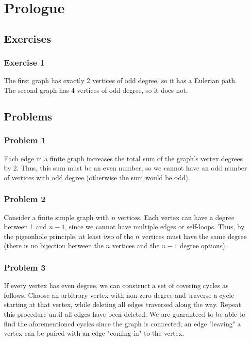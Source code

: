 \section{Prologue}

\subsection{Exercises}

\subsubsection{Exercise 1}
The first graph has exactly 2 vertices of odd degree, so it has a Eulerian path. The second graph has 4 
vertices of odd degree, so it does not. 

\subsection{Problems}

\subsubsection{Problem 1}
Each edge in a finite graph increases the total sum of the graph's vertex degrees by 2. Thus, this sum must
be an even number, so we cannot have an odd number of vertices with odd degree (otherwise the sum would be odd).

\subsubsection{Problem 2}
Consider a finite simple graph with $n$ vertices. Each vertex can have a degree between 1 and $n - 1$, since
we cannot have multiple edges or self-loops. Thus, by the pigeonhole principle, at least two of the $n$ 
vertices must have the same degree (there is no bijection between the $n$ vertices and the $n - 1$ degree
options).

\subsubsection{Problem 3}
If every vertex has even degree, we can construct a set of covering cycles as follows. Choose an arbitrary
vertex with non-zero degree and traverse a cycle starting at that vertex, while deleting all edges traversed along the way.
Repeat this procedure until all edges have been deleted. We are guaranteed to be able to find the
aforementioned cycles since the graph is connected; an edge "leaving" a vertex can be paired with an edge
"coming in" to the vertex.

